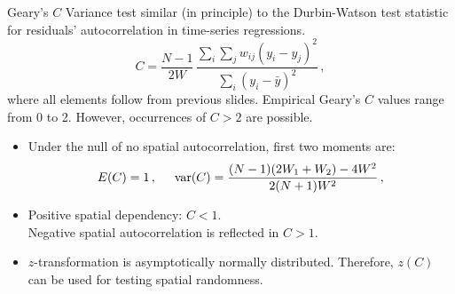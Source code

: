 \documentclass{beamer}
\begin{document}
\begin{frame}{Geary's $C$}
 Variance test similar (in principle) to the Durbin-Watson test statistic for residuals' autocorrelation in time-series regressions.
 \begin{equation*}
C = \frac{N-1}{2W}\,
    \frac{\sum_{i}\sum_{j}w_{ij}(y_i-y_j)^2}
         {\sum_{i}(y_i-\bar{y})^2} \,,
\end{equation*}   
where all elements follow from previous slides. Empirical Geary's $C$ values range from 0 to 2. However, occurrences of $C>2$ are possible.\\
\smallskip
\begin{itemize}
    \item Under the null of no spatial autocorrelation, first two moments are:
\begin{equation*}
E(C) = 1\, ,\hspace{0.5cm}
\textnormal{var}(C) = \frac{(N-1)(2W_1 + W_2) - 4W^2 }{2(N+1)W^2} \,,
\end{equation*}  
\item Positive spatial dependency: $C < 1$.\\ Negative spatial autocorrelation is reflected in $C > 1$.
\smallskip
\item $z$-transformation is asymptotically normally distributed. Therefore, $z(C)$ can be used for testing spatial randomness.
\end{itemize}
\end{frame}
\end{document}
